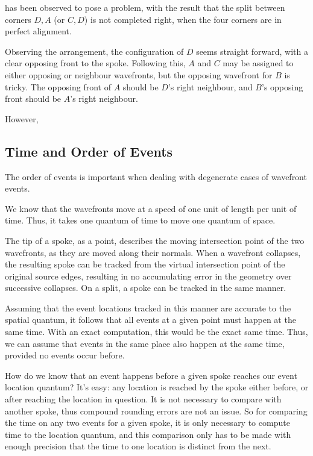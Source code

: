 \documentclass[12pt,a4paper,oneside,openany]{article}
\begin{document}
 has been observed to pose a problem, with the result that the split between corners $D,A$ (or $C,D$) is not completed right, when the four corners are in perfect alignment.

Observing the arrangement, the configuration of $D$ seems straight forward, with a clear opposing front to the spoke. Following this, $A$ and $C$ may be assigned to either opposing or neighbour wavefronts, but the opposing wavefront for $B$ is tricky. The opposing front of $A$ should be $D$'s right neighbour, and $B$'s opposing front should be $A$'s right neighbour.

However, 

\subsection{Time and Order of Events}

The order of events is important when dealing with degenerate cases of wavefront events.

We know that the wavefronts move at a speed of one unit of length per unit of time. Thus, it takes one quantum of time to move one quantum of space.

The tip of a spoke, as a point, describes the moving intersection point of the two wavefronts, as they are moved along their normals. When a wavefront collapses, the resulting spoke can be tracked from the virtual intersection point of the original source edges, resulting in no accumulating error in the geometry over successive collapses. On a split, a spoke can be tracked in the same manner.

Assuming that the event locations tracked in this manner are accurate to the spatial quantum, it follows that all events at a given point must happen at the same time. With an exact computation, this would be the exact same time. Thus, we can assume that events in the same place also happen at the same time, provided no events occur before.

How do we know that an event happens before a given spoke reaches our event location quantum? It's easy: any location is reached by the spoke either before, or after reaching the location in question. It is not necessary to compare with another spoke, thus compound rounding errors are not an issue. So for comparing the time on any two events for a given spoke, it is only necessary to compute time to the location quantum, and this comparison only has to be made with enough precision that the time to one location is distinct from the next.
\end{document}
